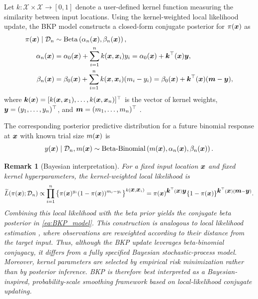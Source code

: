 \documentclass[article, shortnames]{jss}
\newtheorem{remark}{Remark}
\renewcommand{\vec}[1]{\mbox{\boldmath ${#1}$}}
\begin{document}
Let $k: \mathcal{X} \times \mathcal{X} \to [0,1]$ denote a user-defined kernel function measuring the similarity between input locations. 
Using the kernel-weighted local likelihood update, the BKP model constructs a closed-form conjugate posterior for $\pi(\vec{x})$ as
\begin{align}\label{eq:BKP_model}
	\pi(\vec{x}) \mid \mathcal{D}_n &\sim \mathrm{Beta}\left(\alpha_n(\vec{x}), \beta_n(\vec{x})\right), \notag \\
	\alpha_n(\vec{x}) &= \alpha_0(\vec{x}) + \sum_{i=1}^{n} k(\vec{x}, \vec{x}_i) y_i = \alpha_0(\vec{x}) + \vec{k}^\top(\vec{x}) \vec{y}, \\
	\beta_n(\vec{x})  &= \beta_0(\vec{x}) + \sum_{i=1}^{n} k(\vec{x}, \vec{x}_i) (m_i - y_i) = \beta_0(\vec{x}) + \vec{k}^\top(\vec{x}) (\vec{m} - \vec{y}), \notag
\end{align}
where $\vec{k}(\vec{x}) = [k(\vec{x}, \vec{x}_1), \ldots, k(\vec{x}, \vec{x}_n)]^\top$ is the vector of kernel weights, $\vec{y}=(y_1,\ldots,y_n)^\top$,  and $\vec{m}=(m_1,\ldots,m_n)^\top$ \citep{Goetschalckx:2011, Rolland2019BKP}.

The corresponding posterior predictive distribution for a future binomial response at $\vec{x}$ with known trial size $m(\vec{x})$ is
\begin{equation}\label{eq:BKP_predictive_count}
	y(\vec{x}) \mid \mathcal{D}_n, m(\vec{x})
	\sim \mathrm{Beta\mbox{-}Binomial}
	\left(m(\vec{x}), \alpha_n(\vec{x}), \beta_n(\vec{x})\right).
\end{equation}

\begin{remark}[Bayesian interpretation]
For a fixed input location $\vec{x}$ and fixed kernel hyperparameters, the kernel-weighted local likelihood is
\[
	\widetilde{L}(\pi(\vec{x}); \mathcal{D}_n) 
	\propto \prod_{i=1}^{n} \left\{\pi(\vec{x})^{y_i}(1-\pi(\vec{x}))^{m_i - y_i} \right\}^{k(\vec{x}, \vec{x}_i)}
	= \pi(\vec{x})^{\vec{k}^\top(\vec{x}) \vec{y}} \{1 - \pi(\vec{x})\}^{\vec{k}^\top(\vec{x}) (\vec{m}-\vec{y})}.
\]
Combining this local likelihood with the beta prior yields the conjugate beta posterior in \eqref{eq:BKP_model}. 
This construction is analogous to local likelihood estimation \citep{Fan1998LocalMLE}, where observations are reweighted according to their distance from the target input. 
Thus, although the BKP update leverages beta-binomial conjugacy, it differs from a fully specified Bayesian stochastic-process model. 
Moreover, kernel parameters are selected by empirical risk minimization rather than by posterior inference. 
BKP is therefore best interpreted as a Bayesian-inspired, probability-scale smoothing framework based on local-likelihood conjugate updating.
\end{remark}
\end{document}
